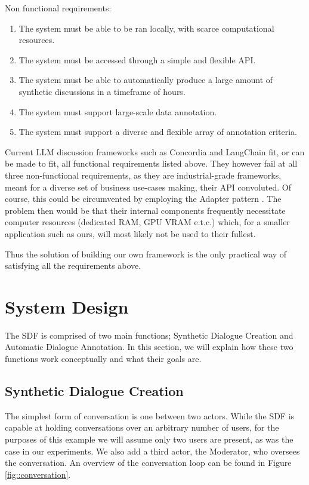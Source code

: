 Non functional requirements:
\begin{enumerate}
	\item The system must be able to be ran locally, with scarce computational resources.
	\item The system must be accessed through a simple and flexible API.
	\item The system must be able to automatically produce a large amount of synthetic discussions in a timeframe of hours.
	\item The system must support large-scale data annotation.
	\item The system must support a diverse and flexible array of annotation criteria.
\end{enumerate}

Current LLM discussion frameworks such as Concordia \cite{Vezhnevets2023GenerativeAM} and LangChain \cite{langchain} fit, or can be made to fit, all functional requirements listed above. They however fail at all three non-functional requirements, as they are industrial-grade frameworks, meant for a diverse set of business use-cases making, their API convoluted. Of course, this could be circumvented by employing the Adapter pattern \cite{gamma1995design}. The problem then would be that their internal components frequently necessitate computer resources (dedicated RAM, GPU VRAM e.t.c.) which, for a smaller application such as ours, will most likely not be used to their fullest.

Thus the solution of building our own framework is the only practical way of satisfying all the requirements above.



\section{System Design}
\label{sec:system:design-system}

The SDF is comprised of two main functions; Synthetic Dialogue Creation and Automatic Dialogue Annotation. In this section, we will explain how these two functions work conceptually and what their goals are.


\subsection{Synthetic Dialogue Creation}
\label{ssec:system:creation}

The simplest form of conversation is one between two actors. While the SDF is capable at holding conversations over an arbitrary number of users, for the purposes of this example we will assume only two users are present, as was the case in our experiments. We also add a third actor, the Moderator, who oversees the conversation. An overview of the conversation loop can be found in Figure \ref{fig::conversation}.

